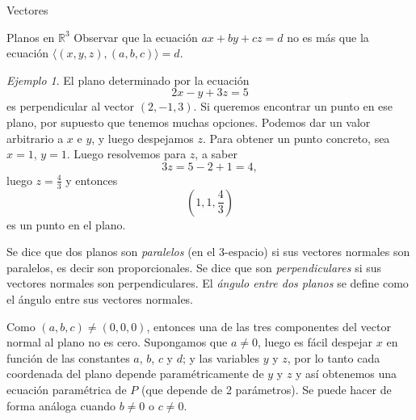 \documentclass[a4paper,12pt,twoside,spanish,reqno]{amsbook}
\numberwithin{equation}{section}
\theoremstyle{definition}
\theoremstyle{remark}
\newtheorem*{ejemplo*}{Ejemplo}
\newcommand{\la}{\langle}
\newcommand{\ra}{\rangle}
\newcommand{\R}{\mathbb R}
\begin{document}
\begin{chapter}{Vectores}
\begin{section}{Planos en $\R^3$}
        Observar que la ecuación $ ax +by +cz =d$ no es más que la ecuación $\la(x,y,z),(a,b,c) \ra=d$. 	
        
        \begin{ejemplo*}
            El plano determinado por la ecuación
            \begin{equation*}
                2x - y 	+ 3z = 	5
            \end{equation*}
            es perpendicular al vector $(2, - 1, 3)$. Si queremos encontrar un punto en ese plano, por supuesto que tenemos muchas opciones. Podemos dar un valor arbitrario a $x$ e $y$, y luego despejamos $z$. Para obtener un punto concreto, sea $x = 1$, $y = 1$. Luego resolvemos para $z$, a saber
            \begin{equation*}
                3z 	= 5 - 2 + 1 = 4,
            \end{equation*}
            luego $z = \displaystyle\frac43$ y entonces
            \begin{equation*}
                (1,1,\frac43)
            \end{equation*}
            es un punto en el plano.
        \end{ejemplo*}
        
        Se dice que dos planos son \textit{paralelos} (en el 3-espacio) si sus vectores normales son paralelos,  es decir son proporcionales. Se dice que son \textit{perpendiculares} si sus vectores normales son perpendiculares. El \textit{ángulo entre dos planos} se define como el ángulo entre sus vectores normales.
        
        
        
        Como $(a,b,c) \ne (0,0,0)$,  entonces una de las tres componentes del vector normal al plano no es cero. Supongamos que $a\ne 0$,  luego es fácil despejar $x$ en función de las constantes $a$, $b$, $c$ y $d$; y las variables $y$ y $z$, por lo tanto cada coordenada del plano depende paramétricamente de $y$ y $z$ y así obtenemos una ecuación paramétrica de $P$ (que depende de 2 parámetros). Se puede hacer de forma análoga cuando $b\ne 0$ o $c \ne 0$. 
        

\end{section}
\end{chapter}
\end{document}

